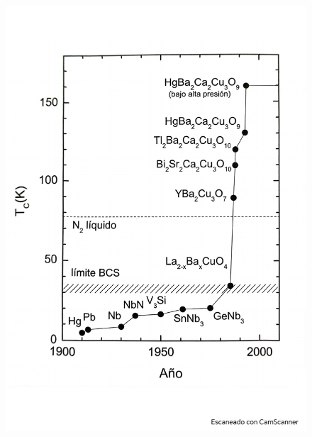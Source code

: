 \begin{figure}[h!] \centering
	\includegraphics[scale=0.5]{Cuerpo/Ch_11/Fotos libro 25.pdf}
	\caption{}
	\label{Fig:11-25}
\end{figure}